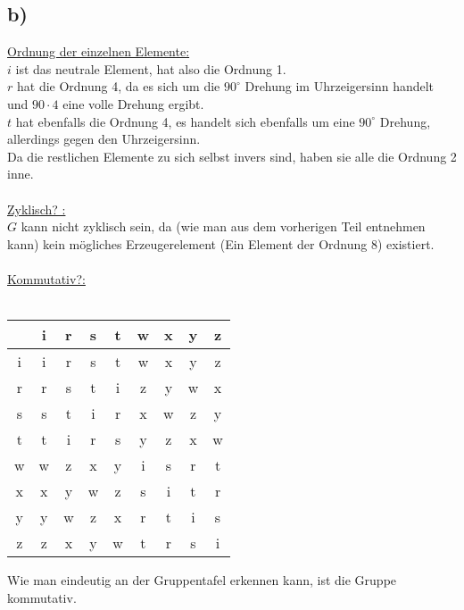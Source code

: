 \documentclass[a4paper]{scrartcl}
\begin{document}
	\subsection{b)}
		\underline{Ordnung der einzelnen Elemente:} \\
		\(i\) ist das neutrale Element, hat also die Ordnung 1. \\
		\(r\) hat die Ordnung 4, da es sich um die \(90^{\circ}\) Drehung im Uhrzeigersinn handelt 
		und \(90\cdot 4\) eine volle Drehung ergibt. \\
		\(t\) hat ebenfalls die Ordnung 4, es handelt sich ebenfalls um eine \(90^{\circ}\) Drehung, 
		allerdings gegen den Uhrzeigersinn. \\
		Da die restlichen Elemente zu sich selbst invers sind, haben sie alle die Ordnung 2 inne. 
		\\\\
		\underline{Zyklisch? :} \\
		\(G\) kann nicht zyklisch sein, da (wie man aus dem vorherigen Teil entnehmen kann) kein 
		mögliches Erzeugerelement (Ein Element der Ordnung 8) existiert. \\ \\
		\underline{Kommutativ?:} \\ \\
		\begin{center}
			\begin{tabular}{c||c|c|c|c|c|c|c|c}
				 &i&r&s&t&w&x&y&z \\ \hline\hline
				i&i&r&s&t&w&x&y&z \\ \hline
				r&r&s&t&i&z&y&w&x \\ \hline
				s&s&t&i&r&x&w&z&y \\ \hline
				t&t&i&r&s&y&z&x&w \\ \hline
				w&w&z&x&y&i&s&r&t \\ \hline
				x&x&y&w&z&s&i&t&r \\ \hline
				y&y&w&z&x&r&t&i&s \\ \hline
				z&z&x&y&w&t&r&s&i \\ 
			\end{tabular} 
		\end{center}
		Wie man eindeutig an der Gruppentafel erkennen kann, ist die Gruppe kommutativ.
\end{document}
